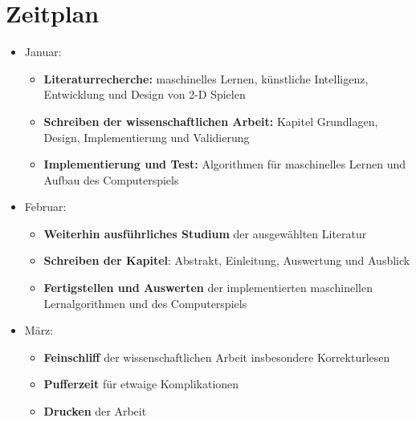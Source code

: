 \documentclass[12pt,a4paper]{article}
\begin{document}
\section*{Zeitplan}
\begin{itemize}
	\item Januar:
	\begin{itemize}
		\item \textbf{Literaturrecherche:} maschinelles Lernen, künstliche Intelligenz, Entwicklung und Design von 2-D Spielen
		\item \textbf{Schreiben der wissenschaftlichen Arbeit:} Kapitel Grundlagen, Design, Implementierung und Validierung
		\item \textbf{Implementierung und Test:} Algorithmen für maschinelles Lernen und Aufbau des Computerspiels
	\end{itemize}
	\item Februar:
	\begin{itemize}
		\item \textbf{Weiterhin ausführliches Studium} der ausgewählten Literatur
		\item \textbf{Schreiben der Kapitel}: Abstrakt, Einleitung, Auswertung und Ausblick
		\item \textbf{Fertigstellen und Auswerten} der implementierten maschinellen Lernalgorithmen und des Computerspiels
	\end{itemize}
	\item März:
	\begin{itemize}
		\item \textbf{Feinschliff} der wissenschaftlichen Arbeit insbesondere Korrekturlesen
		\item \textbf{Pufferzeit} für etwaige Komplikationen
		\item \textbf{Drucken} der Arbeit
	\end{itemize}
\end{itemize}
\end{document}
